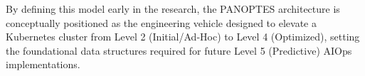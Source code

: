 By defining this model early in the research, the PANOPTES architecture is conceptually positioned as the engineering vehicle designed to elevate a Kubernetes cluster from Level 2 (Initial/Ad-Hoc) to Level 4 (Optimized), setting the foundational data structures required for future Level 5 (Predictive) AIOps implementations.